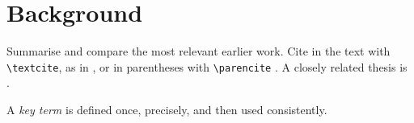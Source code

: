 \chapter{Background}
\label{ch:background}

Summarise and compare the most relevant earlier work. Cite in the text with
\verb|\textcite|, as in \textcite{garcia2020}, or in parentheses with
\verb|\parencite| \parencite{chen2022,garcia2020}. A closely related thesis is \textcite{ahmed2018}.

\begin{definition}
  \label{def:term}
  A \emph{key term} is defined once, precisely, and then used consistently.
\end{definition}
